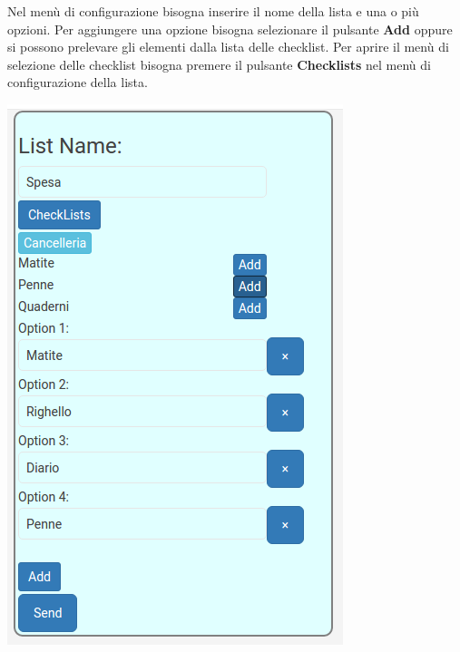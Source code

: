 \begin{flushleft}
Nel menù di configurazione bisogna inserire il nome della lista e una o più opzioni.
Per aggiungere una opzione bisogna selezionare il pulsante \textbf{Add} oppure si possono prelevare gli elementi dalla lista delle checklist.
Per aprire il menù di selezione delle checklist bisogna premere il pulsante \textbf{Checklists} nel menù di configurazione della lista.\\
\begin{center}
\includegraphics[scale=0.75]{img/list_checklist1.png}
\end{center}


\end{flushleft}
